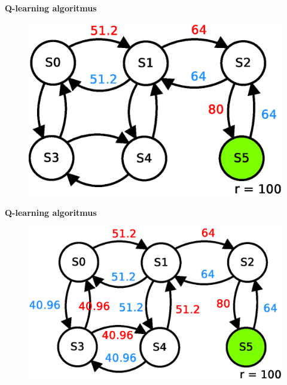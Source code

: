 \documentclass[xcolor=dvipsnames]{beamer}
\begin{document}
\begin{frame}{\bf Q-learning algoritmus}

\begin{figure}[!htb]
\includegraphics[scale=.5]{../diagrams/q_learning_table_05.eps}
\end{figure}

\end{frame}

\begin{frame}{\bf Q-learning algoritmus}

\begin{figure}[!htb]
\includegraphics[scale=.5]{../diagrams/q_learning_table_06.eps}
\end{figure}

\end{frame}
\end{document}
